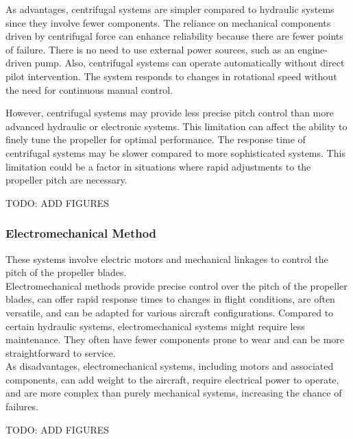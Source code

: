 As advantages, centrifugal systems are simpler compared to hydraulic systems since they involve fewer components.
The reliance on mechanical components driven by centrifugal force can enhance reliability because there are fewer points of failure.
There is no need to use external power sources, such as an engine-driven pump.
Also, centrifugal systems can operate automatically without direct pilot intervention.
The system responds to changes in rotational speed without the need for continuous manual control.

However, centrifugal systems may provide less precise pitch control than more advanced hydraulic or electronic systems. This limitation can affect the ability to finely tune the propeller for optimal performance.
The response time of centrifugal systems may be slower compared to more sophisticated systems. This limitation could be a factor in situations where rapid adjustments to the propeller pitch are necessary.\cite{VPP2}

TODO: ADD FIGURES

\subsubsection{Electromechanical Method}
These systems involve electric motors and mechanical linkages to control the pitch of the propeller blades.\\

Electromechanical methods provide precise control over the pitch of the propeller blades, can offer rapid response times to changes in flight conditions, are often versatile, and can be adapted for various aircraft configurations.
Compared to certain hydraulic systems, electromechanical systems might require less maintenance.
They often have fewer components prone to wear and can be more straightforward to service.\\

As disadvantages, electromechanical systems, including motors and associated components, can add weight to the aircraft, require electrical power to operate, and are more complex than purely mechanical systems, increasing the chance of failures.\cite{VPP2}

TODO: ADD FIGURES

